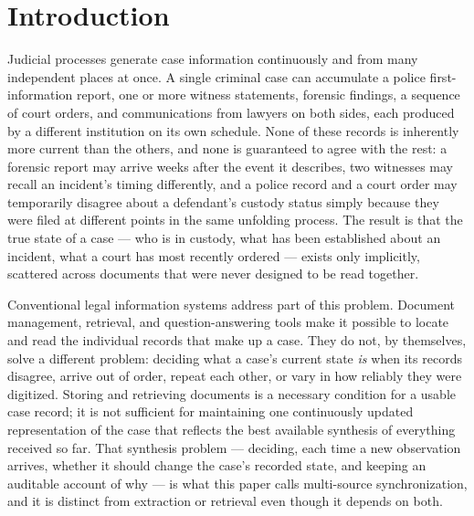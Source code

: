 \documentclass[conference]{IEEEtran}
\begin{document}
\section{Introduction}
\label{sec:introduction}

Judicial processes generate case information continuously and from many
independent places at once. A single criminal case can accumulate a police
first-information report, one or more witness statements, forensic findings,
a sequence of court orders, and communications from lawyers on both sides,
each produced by a different institution on its own schedule. None of these
records is inherently more current than the others, and none is guaranteed
to agree with the rest: a forensic report may arrive weeks after the event
it describes, two witnesses may recall an incident's timing differently, and
a police record and a court order may temporarily disagree about a
defendant's custody status simply because they were filed at different
points in the same unfolding process. The result is that the true state of a
case --- who is in custody, what has been established about an incident,
what a court has most recently ordered --- exists only implicitly, scattered
across documents that were never designed to be read together.

Conventional legal information systems address part of this problem.
Document management, retrieval, and question-answering tools make it
possible to locate and read the individual records that make up a case.
They do not, by themselves, solve a different problem: deciding what a
case's current state \emph{is} when its records disagree, arrive out of
order, repeat each other, or vary in how reliably they were digitized.
Storing and retrieving documents is a necessary condition for a usable case
record; it is not sufficient for maintaining one continuously updated
representation of the case that reflects the best available synthesis of
everything received so far. That synthesis problem --- deciding, each time a
new observation arrives, whether it should change the case's recorded
state, and keeping an auditable account of why --- is what this paper calls
multi-source synchronization, and it is distinct from extraction or
retrieval even though it depends on both.
\end{document}
